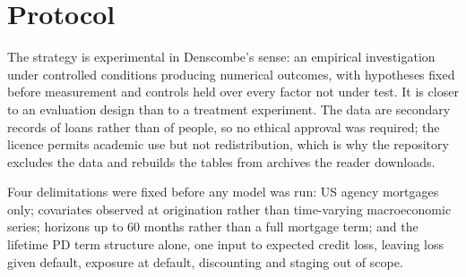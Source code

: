 \documentclass[11pt,journal]{IEEEtran}
\begin{document}
\section{Protocol}
The strategy is experimental in Denscombe's sense: an empirical investigation
under controlled conditions producing numerical outcomes, with hypotheses fixed
before measurement and controls held over every factor not under test. It is closer to an
evaluation design than to a treatment experiment. The data are secondary records of loans rather than of people, so no ethical
approval was required; the licence permits academic use but not redistribution,
which is why the repository excludes the data and rebuilds the tables from
archives the reader downloads.

Four delimitations were fixed before any model was run: US agency mortgages
only; covariates observed at origination rather than time-varying macroeconomic
series; horizons up to 60 months rather than a full mortgage term; and the
lifetime PD term structure alone, one input to expected credit loss, leaving
loss given default, exposure at default, discounting and staging out of scope.
\end{document}
